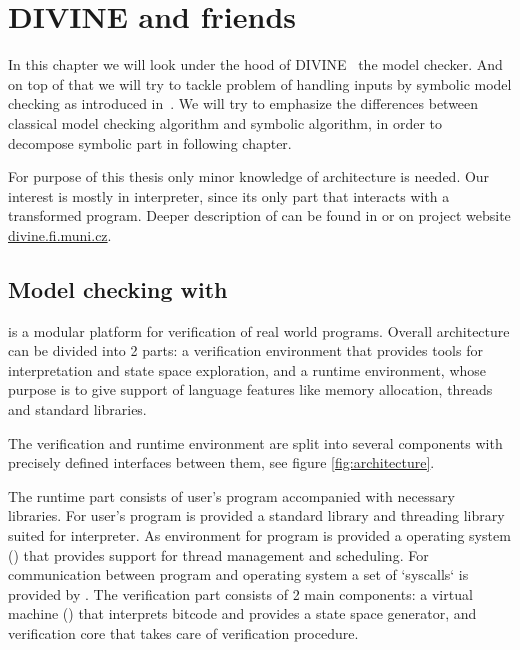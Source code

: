 \chapter{DIVINE and friends}\label{ch:divine}

In this chapter we will look under the hood of DIVINE~\cite{Divine17} the model checker.
And on top of that we will try to tackle problem of handling inputs by
symbolic model checking as introduced in~\cite{Barnat14}. We will try to emphasize the
differences between classical model checking algorithm and symbolic algorithm,
in order to decompose symbolic part in following chapter.

For purpose of this thesis only minor knowledge of \DIVINE architecture is
needed. Our interest is mostly in \LLVM interpreter, since its only part that
interacts with a transformed program. Deeper description of \DIVINE can be found
in \cite{Divine17} or on project website
\href{https://divine.fi.muni.cz/}{divine.fi.muni.cz}.

\section{Model checking with \DIVINE}


\DIVINE is a modular platform for verification of real world programs.
Overall architecture can be divided into 2 parts: a verification environment
that provides tools for \LLVM interpretation and state space exploration, and a
runtime environment, whose purpose is to give support of language features like
memory allocation, threads and standard libraries.

The verification and runtime environment are split into several components with
precisely defined interfaces between them, see figure \autoref{fig:architecture}.

The runtime part consists of user's program accompanied with necessary
libraries. For user's program is provided a \Cpp{} standard library and threading
library suited for \DIVINE interpreter. As environment for program is provided
a \DIVINE operating system (\DIOS) that provides support for thread management
and scheduling. For communication between program and operating system a set
of `syscalls` is provided by \DIOS.
The verification part consists of 2 main components: a \DIVINE virtual machine
(\DIVM) that interprets \LLVM bitcode and provides a state space generator, and
verification core that takes care of verification procedure.

